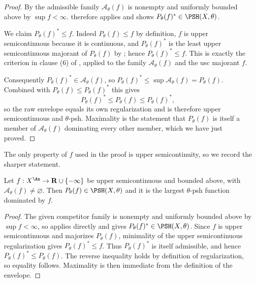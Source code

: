 \begin{proof}
By  the admissible family
$\mathcal A_\theta(f)$ is nonempty and uniformly bounded above by
$\sup f<\infty$.   therefore applies and
shows $P_\theta(f)^*\in\PSH(X,\theta)$.

We claim $P_\theta(f)^*\leq f$.  Indeed $P_\theta(f)\leq f$ by
definition, $f$ is upper semicontinuous because it is continuous, and
$P_\theta(f)^*$ is the least upper semicontinuous majorant of
$P_\theta(f)$ by ; hence
$P_\theta(f)^*\leq f$.  This is exactly the criterion in clause (6) of
, applied to the family
$\mathcal A_\theta(f)$ and the usc majorant $f$.

Consequently $P_\theta(f)^*\in\mathcal A_\theta(f)$, so
$P_\theta(f)^*\leq\sup\mathcal A_\theta(f)=P_\theta(f)$.  Combined with
$P_\theta(f)\leq P_\theta(f)^*$ this gives
\[
               P_\theta(f)^*\leq P_\theta(f)\leq P_\theta(f)^*,
\]
so the raw envelope equals its own regularization and is therefore upper
semicontinuous and $\theta$-psh.  Maximality is the statement that
$P_\theta(f)$ is itself a member of $\mathcal A_\theta(f)$ dominating
every other member, which we have just proved.
\end{proof}

The only property of $f$ used in the proof is upper semicontinuity, so we
record the sharper statement.

\begin{corollary}
\label{cor:ch23-usc-obstacle}
Let $f:X^{\An}\to\mathbf R\cup\{-\infty\}$ be upper semicontinuous and
bounded above, with $\mathcal A_\theta(f)\ne\varnothing$.  Then
$P_\theta(f)\in\PSH(X,\theta)$ and it is the largest $\theta$-psh
function dominated by $f$.
\end{corollary}

\begin{proof}
The given competitor family is nonempty and uniformly bounded above by
$\sup f<\infty$, so  applies directly and
gives $P_\theta(f)^*\in\PSH(X,\theta)$.  Since $f$ is upper
semicontinuous and majorizes $P_\theta(f)$, minimality of the upper
semicontinuous regularization gives $P_\theta(f)^*\leq f$.  Thus
$P_\theta(f)^*$ is itself admissible, and hence
$P_\theta(f)^*\leq P_\theta(f)$.  The reverse inequality holds by
definition of regularization, so equality follows.  Maximality is then
immediate from the definition of the envelope.
\end{proof}

